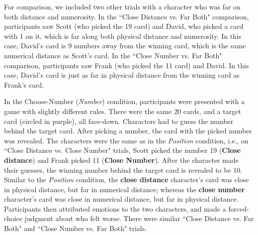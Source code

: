 \documentclass[10pt,letterpaper]{article}
\begin{document}
	For comparison, we included two other trials with a character who was far on both distance and numerosity. In the ``Close Distance vs. Far Both" comparison, participants saw Scott (who picked the 19 card) and David, who picked a card with 1 on it, which is far along both physical distance and numerosity. In this case, David's card is 9 numbers away from the winning card, which is the same numerical distance as Scott's card. In the ``Close Number vs. Far Both" comparison, participants saw Frank (who picked the 11 card) and David. In this case, David's card is just as far in physical distance from the winning card as Frank's card.


	In the Choose-Number (\textit{Number}) condition, participants were presented with a game with slightly different rules. There were the same 20 cards, and a target card (circled in purple), all face-down. Characters had to guess the number behind the target card. After picking a number, the card with the picked number was revealed. The characters were the same as in the \textit{Position} condition, i.e., on ``Close Distance vs. Close Number" trials, Scott picked the number 19 (\textbf{Close distance}) and Frank picked 11 (\textbf{Close Number}). After the character made their guesses, the winning number behind the target card is revealed to be 10. Similar to the \textit{Position} condition, the \textbf{close distance} character's card was close in physical distance, but far in numerical distance; whereas the \textbf{close number} character's card was close in numerical distance, but far in physical distance. Participants then attributed emotions to the two characters, and made a forced-choice judgment about who felt worse. There were similar ``Close Distance vs. Far Both" and ``Close Number vs. Far Both" trials.


\begin{table}
\caption{Predictions for near-miss effects in Experiment 2. Near-miss effects are predicted to be strongest when agents are close on a dimension over which they have illusory control.}
\label{Expt2Predictions}
\end{table}
\end{document}
